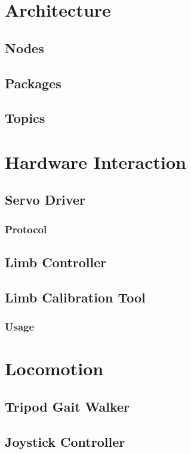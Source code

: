 \documentclass{l4proj}
\begin{document}
\chapter{Architecture}
\section{Nodes}
\section{Packages}
\section{Topics}

\chapter{Hardware Interaction}

\section{Servo Driver}
\subsection{Protocol}

\section{Limb Controller}
\section{Limb Calibration Tool}
\subsection{Usage}

\chapter{Locomotion}

\section{Tripod Gait Walker}
\section{Joystick Controller}
\end{document}
